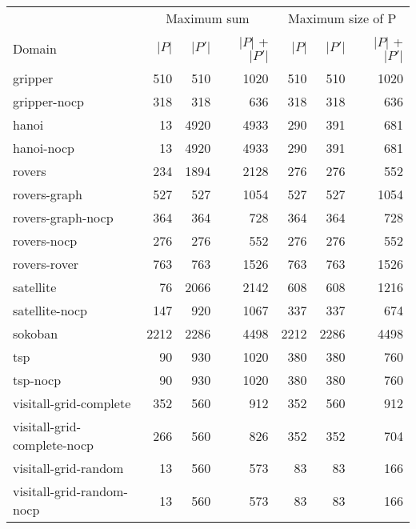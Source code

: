 \begin{tabular}{l|rrr|rrr}
	\toprule
	& \multicolumn{3}{c|}{Maximum sum} & \multicolumn{3}{c}{Maximum size of P}\\
	Domain & $\vert P \vert$ & $\vert P' \vert$ & $\vert P \vert$ + $\vert P' \vert$ & $\vert P \vert$  & $\vert P' \vert$ & $\vert P \vert$ + $\vert P' \vert$ \\
	\midrule
	gripper & 510 & 510 & 1020 & 510 & 510 & 1020 \\
	gripper-nocp & 318 & 318 & 636 & 318 & 318 & 636 \\
	hanoi & 13 & 4920 & 4933 & 290 & 391 & 681 \\
	hanoi-nocp & 13 & 4920 & 4933 & 290 & 391 & 681 \\
	rovers & 234 & 1894 & 2128 & 276 & 276 & 552 \\
	rovers-graph & 527 & 527 & 1054 & 527 & 527 & 1054 \\
	rovers-graph-nocp & 364 & 364 & 728 & 364 & 364 & 728 \\
	rovers-nocp & 276 & 276 & 552 & 276 & 276 & 552 \\
	rovers-rover & 763 & 763 & 1526 & 763 & 763 & 1526 \\
	satellite & 76 & 2066 & 2142 & 608 & 608 & 1216 \\
	satellite-nocp & 147 & 920 & 1067 & 337 & 337 & 674 \\
	sokoban & 2212 & 2286 & 4498 & 2212 & 2286 & 4498 \\
	tsp & 90 & 930 & 1020 & 380 & 380 & 760 \\
	tsp-nocp & 90 & 930 & 1020 & 380 & 380 & 760 \\
	visitall-grid-complete & 352 & 560 & 912 & 352 & 560 & 912 \\
	visitall-grid-complete-nocp & 266 & 560 & 826 & 352 & 352 & 704 \\
	visitall-grid-random & 13 & 560 & 573 & 83 & 83 & 166 \\
	visitall-grid-random-nocp & 13 & 560 & 573 & 83 & 83 & 166 \\
	\bottomrule
\end{tabular}
